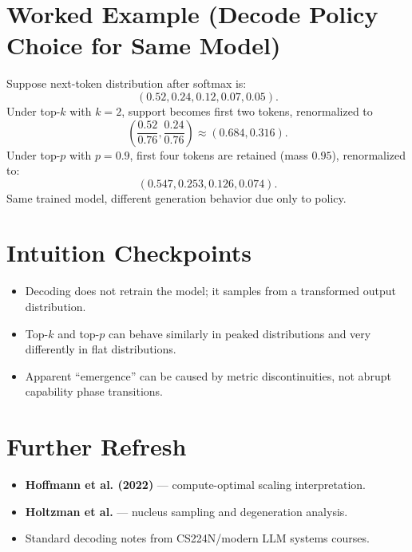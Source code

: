 \section*{Worked Example (Decode Policy Choice for Same Model)}
Suppose next-token distribution after softmax is:
\[
(0.52,0.24,0.12,0.07,0.05).
\]
Under top-$k$ with $k=2$, support becomes first two tokens, renormalized to
\[
\left(\frac{0.52}{0.76},\frac{0.24}{0.76}\right)\approx(0.684,0.316).
\]
Under top-$p$ with $p=0.9$, first four tokens are retained (mass $0.95$), renormalized to:
\[
(0.547,0.253,0.126,0.074).
\]
Same trained model, different generation behavior due only to policy.

\section*{Intuition Checkpoints}
\begin{itemize}[leftmargin=1.5em]
  \item Decoding does not retrain the model; it samples from a transformed output distribution.
  \item Top-$k$ and top-$p$ can behave similarly in peaked distributions and very differently in flat distributions.
  \item Apparent ``emergence'' can be caused by metric discontinuities, not abrupt capability phase transitions.
\end{itemize}

\section*{Further Refresh}
\begin{itemize}[leftmargin=1.5em]
  \item \textbf{Hoffmann et al. (2022)} --- compute-optimal scaling interpretation.
  \item \textbf{Holtzman et al.} --- nucleus sampling and degeneration analysis.
  \item Standard decoding notes from CS224N/modern LLM systems courses.
\end{itemize}
